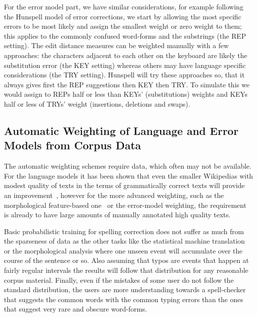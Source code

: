 \documentclass[a4paper,12pt]{article}
\begin{document}
For the error model part, we have similar considerations, for example
following the Hunspell model of error corrections, we start by allowing the
most specific errors to be most likely and assign the smallest weight or zero
weight to them; this applies to the commonly confused word-forms and the
substrings (the REP setting). The edit distance measures can be weighted
manually with a few approaches: the characters adjacent to each other on the
keyboard are likely the substitution error (the KEY setting) whereas others
may have language specific considerations (the TRY setting).  Hunspell will try
these approaches so, that it always gives first the REP suggestions then KEY
then TRY. To simulate this we would assign to REPs half or less than KEYs'
(substitutions) weights and KEYs half or less of TRYs' weight (insertions,
deletions and swaps).

\subsection{Automatic Weighting of Language and Error Models from Corpus Data}
\label{subsec:automatic-weighting}

The automatic weighting schemes require data, which often may not be available.
For the language models it has been shown that even the smaller Wikipedias
with modest quality of texts in the terms of grammatically correct texts will
provide an improvement~\cite[]{pirinen/2010/lrec}, however for the more
advanced weighting, such as the morphological feature-based
one~\cite[]{pirinen2012improving} or the error-model weighting, the requirement
is already to have large amounts of manually annotated high quality texts. 

Basic probabilistic training for spelling correction does not suffer as much
from the sparseness of data as the other tasks like the statistical machine
translation or the morphological analysis where one unseen event will
accumulate over the course of the sentence or so. Also assuming that typos are
events that happen at fairly regular intervals the results will follow that
distribution for any reasonable corpus material. Finally, even if the mistakes
of some user do not follow the standard distribution, the users are more
understanding towards a spell-checker that suggests the common words with the
common typing errors than the ones that suggest very rare and obscure
word-forms.
\end{document}
